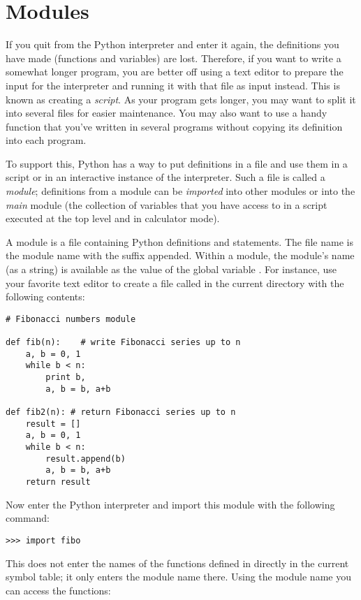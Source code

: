 \documentclass{manual}
\begin{document}
\chapter{Modules \label{modules}}

If you quit from the Python interpreter and enter it again, the
definitions you have made (functions and variables) are lost.
Therefore, if you want to write a somewhat longer program, you are
better off using a text editor to prepare the input for the interpreter
and running it with that file as input instead.  This is known as creating a
\emph{script}.  As your program gets longer, you may want to split it
into several files for easier maintenance.  You may also want to use a
handy function that you've written in several programs without copying
its definition into each program.

To support this, Python has a way to put definitions in a file and use
them in a script or in an interactive instance of the interpreter.
Such a file is called a \emph{module}; definitions from a module can be
\emph{imported} into other modules or into the \emph{main} module (the
collection of variables that you have access to in a script
executed at the top level
and in calculator mode).

A module is a file containing Python definitions and statements.  The
file name is the module name with the suffix  appended.  Within
a module, the module's name (as a string) is available as the value of
the global variable .  For instance, use your favorite text
editor to create a file called  in the current directory
with the following contents:

\begin{verbatim}
# Fibonacci numbers module

def fib(n):    # write Fibonacci series up to n
    a, b = 0, 1
    while b < n:
        print b,
        a, b = b, a+b

def fib2(n): # return Fibonacci series up to n
    result = []
    a, b = 0, 1
    while b < n:
        result.append(b)
        a, b = b, a+b
    return result
\end{verbatim}

Now enter the Python interpreter and import this module with the
following command:

\begin{verbatim}
>>> import fibo
\end{verbatim}

This does not enter the names of the functions defined in  
directly in the current symbol table; it only enters the module name
 there.
Using the module name you can access the functions:
\end{document}
